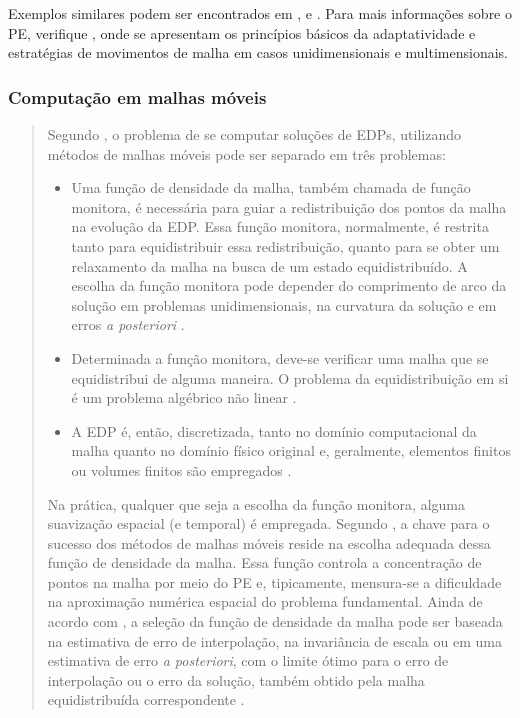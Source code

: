Exemplos similares podem ser encontrados em ,  e . Para mais informações sobre o PE, verifique , onde se apresentam os princípios básicos da adaptatividade e estratégias de movimentos de malha em casos unidimensionais e multimensionais.

\subsubsection{Computação em malhas móveis}
\label{cap_computacao_malhas_moveis}

\begin{quotation}

Segundo , o problema de se computar soluções de EDPs, utilizando métodos de malhas móveis pode ser separado em três problemas:
\begin{itemize}

\item Uma função de densidade da malha, também chamada de função monitora, é necessária para guiar a redistribuição dos pontos da malha na evolução da EDP. Essa função monitora, normalmente, é restrita tanto para equidistribuir essa redistribuição, quanto para se obter um relaxamento da malha na busca de um estado equidistribuído. A escolha da função monitora pode depender do comprimento de arco da solução em problemas unidimensionais, na curvatura da solução e em erros {\it a posteriori} . 

\item Determinada a função monitora, deve-se verificar uma malha que se equidistribui de alguma maneira. O problema da equidistribuição em si é um problema algébrico não linear . 

\item A EDP é, então, discretizada, tanto no domínio computacional da malha quanto no domínio físico original e, geralmente, elementos finitos ou volumes finitos são empregados \cite{Oliveira2013}.
\end{itemize}

Na prática, qualquer que seja a escolha da função monitora, alguma suavização espacial (e temporal) é empregada. Segundo , a chave para o sucesso dos métodos de malhas móveis reside na escolha adequada dessa função de densidade da malha. Essa função controla a concentração de pontos na malha por meio do PE e, tipicamente, mensura-se a dificuldade na aproximação numérica espacial do problema fundamental. Ainda de acordo com , a seleção da função de densidade da malha pode ser baseada na estimativa de erro de interpolação, na invariância de escala ou em uma estimativa de erro {\it a posteriori}, com o limite ótimo para o erro de interpolação ou o erro da solução, também obtido pela malha equidistribuída correspondente \cite{Oliveira2013}. 
\end{quotation}

